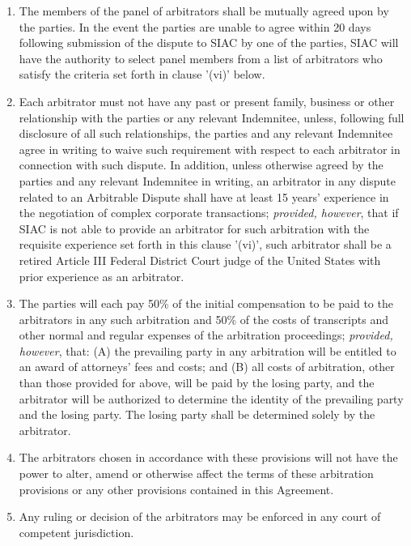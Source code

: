 \documentclass{article}
\begin{document}
\begin{enumerate}[label=\Alph*.]
\begin{enumerate}
              \item The members of the panel of arbitrators shall be mutually agreed upon by the parties. In the event the parties are unable to agree within 20 days following submission of the dispute to SIAC by one of the parties, SIAC will have the authority to select panel members from a list of arbitrators who satisfy the criteria set forth in clause '(vi)' below.

              \item Each arbitrator must not have any past or present family, business or other relationship with the parties or any relevant Indemnitee, unless, following full disclosure of all such relationships, the parties and any relevant Indemnitee agree in writing to waive such requirement with respect to each arbitrator in connection with such dispute. In addition, unless otherwise agreed by the parties and any relevant Indemnitee in writing, an arbitrator in any dispute related to an Arbitrable Dispute shall have at least 15 years' experience in the negotiation of complex corporate transactions; \textit{provided, however}, that if SIAC is not able to provide an arbitrator for such arbitration with the requisite experience set forth in this clause '(vi)', such arbitrator shall be a retired Article III Federal District Court judge of the United States with prior experience as an arbitrator.

              \item The parties will each pay 50\% of the initial compensation to be paid to the arbitrators in any such arbitration and 50\% of the costs of transcripts and other normal and regular expenses of the arbitration proceedings; \textit{provided, however}, that: (A) the prevailing party in any arbitration will be entitled to an award of attorneys' fees and costs; and (B) all costs of arbitration, other than those provided for above, will be paid by the losing party, and the arbitrator will be authorized to determine the identity of the prevailing party and the losing party. The losing party shall be determined solely by the arbitrator.

              \item The arbitrators chosen in accordance with these provisions will not have the power to alter, amend or otherwise affect the terms of these arbitration provisions or any other provisions contained in this Agreement.

              \item Any ruling or decision of the arbitrators may be enforced in any court of competent jurisdiction.

          \end{enumerate}
\end{enumerate}
\end{document}
